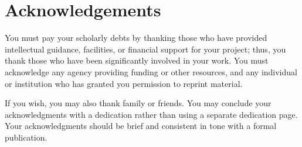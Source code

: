 \chapter{Acknowledgements}
\doublespacing
You must pay your scholarly debts by thanking those who have provided intellectual guidance, facilities, or financial support for your project; thus, you thank those who have been significantly involved in your work. You must acknowledge any agency providing funding or other resources, and any individual or institution who has granted you permission to reprint material.

If you wish, you may also thank family or friends. You may conclude your acknowledgments with a dedication rather than using a separate dedication page. Your acknowledgments should be brief and consistent in tone with a formal publication.

